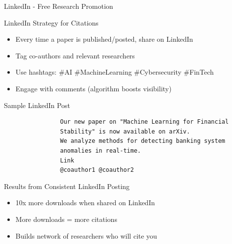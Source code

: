 \documentclass[11pt]{beamer}
\begin{document}
	\begin{frame}{LinkedIn - Free Research Promotion}
		\scriptsize
		\begin{block}{LinkedIn Strategy for Citations}
			\begin{itemize}
				\item Every time a paper is published/posted, share on LinkedIn
				\item Tag co-authors and relevant researchers
				\item Use hashtags: \#AI \#MachineLearning \#Cybersecurity \#FinTech
				\item Engage with comments (algorithm boosts visibility)
			\end{itemize}
		\end{block}
		\begin{block}{Sample LinkedIn Post}
			\begin{verbatim}
				Our new paper on "Machine Learning for Financial 
				Stability" is now available on arXiv. 
				We analyze methods for detecting banking system 
				anomalies in real-time.
				Link 
				@coauthor1 @coauthor2
			\end{verbatim}
		\end{block}
		\begin{block}{Results from Consistent LinkedIn Posting}
			\begin{itemize}
				\item 10x more downloads when shared on LinkedIn
				\item More downloads = more citations
				\item Builds network of researchers who will cite you
			\end{itemize}
		\end{block}
	\end{frame}
	
\end{document}

